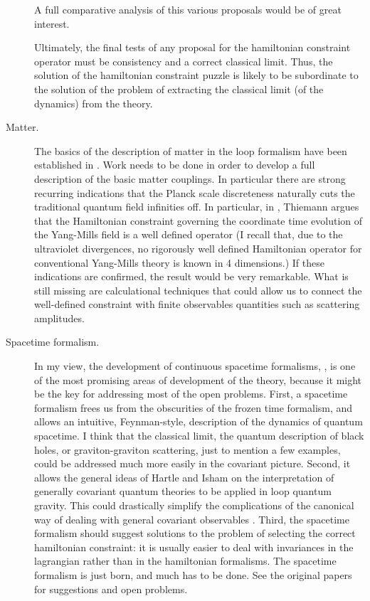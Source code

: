 \begin{description}
A full comparative analysis of this various proposals 
would be of great interest. 

Ultimately, the final tests of any proposal for the 
hamiltonian constraint operator must be consistency and a 
correct classical limit.  Thus, the solution of the 
hamiltonian constraint puzzle is likely to be subordinate 
to the solution of the problem of extracting the classical 
limit (of the dynamics) from the theory.
	
\item[Matter.] 

The basics of the description of matter in the loop 
formalism have been established in 
\cite{MoralesRovelli,MoralesRovelli2,KrasnovMatter,%
Baez,ThiemannFermions,ThiemannYM}.  Work needs to be done in order to 
develop a full description of the basic matter couplings.  In 
particular there are strong recurring indications that the Planck 
scale discreteness naturally cuts the traditional quantum field 
infinities off.  In particular, in \cite{ThiemannYM}, Thiemann argues 
that the Hamiltonian constraint governing the coordinate time 
evolution of the Yang-Mills field is a well defined operator (I recall 
that, due to the ultraviolet divergences, no rigorously well defined 
Hamiltonian operator for conventional Yang-Mills theory is known in 4 
dimensions.)  If these indications are confirmed, the result would be 
very remarkable.  What is still missing are calculational techniques 
that could allow us to connect the well-defined constraint with finite 
observables quantities such as scattering amplitudes.

\item[Spacetime formalism.]

 In my view, the development of continuous spacetime formalisms, 
 \cite{RovelliSurf,ReisenbergerRovelli,Baez97,SmolinMarkopoulo}, 
 is one of the most promising areas of development of the theory, 
 because it might be the key for addressing most of the open 
 problems.  First, a spacetime formalism frees us from the 
 obscurities of the frozen time formalism, and allows an 
 intuitive, Feynman-style, description of the dynamics of quantum 
 spacetime.  I think that the classical limit, the quantum 
 description of black holes, or graviton-graviton scattering, just 
 to mention a few examples, could be addressed much more easily in 
 the covariant picture.  Second, it allows the general ideas of 
 Hartle \cite{Hartle} and Isham \cite{Isham,Isham2,Isham3,Isham4} 
 on the interpretation of generally covariant quantum theories to 
 be applied in loop quantum gravity.  This could drastically 
 simplify the complications of the canonical way of dealing with 
 general covariant observables 
 \cite{RovelliObservables,RovelliObservables2}.  Third, the 
 spacetime formalism should suggest solutions to the problem of 
 selecting the correct hamiltonian constraint: it is usually 
 easier to deal with invariances in the lagrangian rather than in 
 the hamiltonian formalisms.  The spacetime formalism is just 
 born, and much has to be done.  See the original papers for 
 suggestions and open problems.


\end{description}

